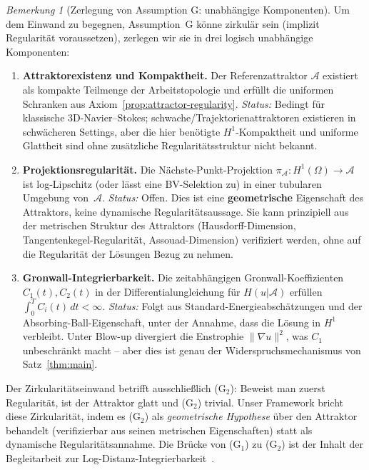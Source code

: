 \documentclass[12pt,a4paper]{article}
\theoremstyle{definition}
\theoremstyle{plain}
\theoremstyle{remark}
\newtheorem{remark}[definition]{Bemerkung}
\begin{document}
\begin{remark}[Zerlegung von Assumption G: unabhängige Komponenten]
\label{rem:g-decomposition}
Um dem Einwand zu begegnen, Assumption~G könne zirkulär sein (implizit Regularität voraussetzen), zerlegen wir sie in drei logisch unabhängige Komponenten:

\begin{enumerate}
\item[\textbf{(G$_1$)}] \textbf{Attraktorexistenz und Kompaktheit.} Der Referenzattraktor $\mathcal{A}$ existiert als kompakte Teilmenge der Arbeitstopologie und erfüllt die uniformen Schranken aus Axiom~\ref{prop:attractor-regularity}. \emph{Status:} Bedingt für klassische 3D-Navier--Stokes; schwache/Trajektorienattraktoren existieren in schwächeren Settings, aber die hier benötigte $H^1$-Kompaktheit und uniforme Glattheit sind ohne zusätzliche Regularitätsstruktur nicht bekannt.

\item[\textbf{(G$_2$)}] \textbf{Projektionsregularität.} Die Nächste-Punkt-Projektion $\pi_\mathcal{A}: H^1(\Omega) \to \mathcal{A}$ ist log-Lipschitz (oder lässt eine BV-Selektion zu) in einer tubularen Umgebung von~$\mathcal{A}$. \emph{Status:} Offen. Dies ist eine \textbf{geometrische} Eigenschaft des Attraktors, keine dynamische Regularitätsaussage. Sie kann prinzipiell aus der metrischen Struktur des Attraktors (Hausdorff-Dimension, Tangentenkegel-Regularität, Assouad-Dimension) verifiziert werden, ohne auf die Regularität der Lösungen Bezug zu nehmen.

\item[\textbf{(G$_3$)}] \textbf{Gronwall-Integrierbarkeit.} Die zeitabhängigen Gronwall-Koeffizienten $C_1(t), C_2(t)$ in der Differentialungleichung für $H(u|\mathcal{A})$ erfüllen $\int_0^T C_i(t)\,dt < \infty$. \emph{Status:} Folgt aus Standard-Energieabschätzungen und der Absorbing-Ball-Eigenschaft, unter der Annahme, dass die Lösung in $H^1$ verbleibt. Unter Blow-up divergiert die Enstrophie $\|\nabla u\|^2$, was $C_1$ unbeschränkt macht -- aber dies ist genau der Widerspruchsmechanismus von Satz~\ref{thm:main}.
\end{enumerate}

Der Zirkularitätseinwand betrifft ausschließlich (G$_2$): Beweist man zuerst Regularität, ist der Attraktor glatt und (G$_2$) trivial. Unser Framework bricht diese Zirkularität, indem es (G$_2$) als \emph{geometrische Hypothese} über den Attraktor behandelt (verifizierbar aus seinen metrischen Eigenschaften) statt als dynamische Regularitätsannahme. Die Brücke von (G$_1$) zu (G$_2$) ist der Inhalt der Begleitarbeit zur Log-Distanz-Integrierbarkeit~\cite{Geiger2026-LDI}.
\end{remark}
\end{document}
